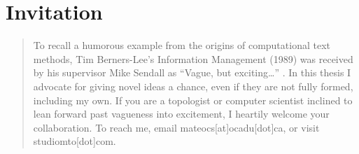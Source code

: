 
\chapter*{Invitation}
\label{Invitation}
\noindent
\begin{quote}
    To recall a humorous example from the origins of computational text methods, Tim Berners-Lee’s Information Management (1989) was received by his supervisor Mike Sendall as “Vague, but exciting…” \citep{cern_tim_2008}. In this thesis I advocate for giving novel ideas a chance, even if they are not fully formed, including my own. If you are a topologist or computer scientist inclined to lean forward past vagueness into excitement, I heartily welcome your collaboration. To reach me, email mateocs[at]ocadu[dot]ca, or visit studiomto[dot]com.
\end{quote}
    \vspace*{\fill} %
    \newpage